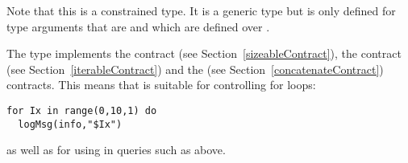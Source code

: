 Note that this is a constrained type. It is a generic type but is only defined for type arguments that are  and which are defined over .

The  type implements the  contract (see Section~\vref{sizeableContract}), the  contract (see Section~\ref{iterableContract}) and the  (see Section~\vref{concatenateContract}) contracts. This means that  is suitable for controlling for loops:
\begin{lstlisting}
for Ix in range(0,10,1) do
  logMsg(info,"$Ix")
\end{lstlisting}
as well as for using in queries such as above.
